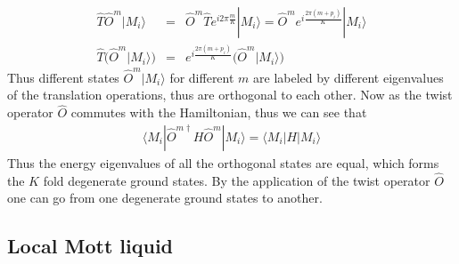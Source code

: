 \documentclass[reprint,prb,superscriptaddress]{revtex4-2}
\begin{document}
\begin{eqnarray}
\hat{T} \hat{O}^m |M_i\rangle &=& \hat{O}^m \hat{T} e^{i2\pi \frac{m}{K}} |M_i\rangle =\hat{O}^m e^{i \frac{2\pi(m+p_i)}{K} } |M_i\rangle \nonumber\\
\hat{T} \bigg(\hat{O}^m |M_i\rangle \bigg) &=&  e^{i \frac{2\pi(m+p_i)}{K} } \bigg( \hat{O}^m |M_i\rangle \bigg)
\end{eqnarray}
Thus different states $ \hat{O}^m |M_i\rangle$ for different $m$ are labeled by different eigenvalues of the translation operations, thus are orthogonal to each other. Now as the twist operator $\hat{O}$ commutes with the Hamiltonian, thus we can see that 
\begin{eqnarray}
\langle M_i| \hat{O}^{m \dagger}  H \hat{O}^m |M_i\rangle =\langle M_i|  H |M_i\rangle 
\end{eqnarray}
Thus the energy eigenvalues of all the orthogonal states are equal, which forms the $K$ fold degenerate ground states. By the application of the twist operator $\hat{O}$ one can go from one degenerate ground states to another.





\subsection{Local Mott liquid}
\label{sec:loc_mott_liquid}
\end{document}
